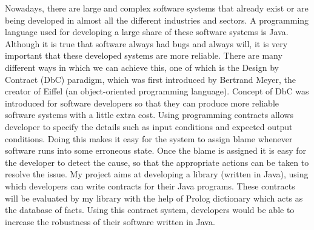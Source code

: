 Nowadays, there are large and complex software systems that already
exist or are being developed in almost all the different industries and
sectors. A programming language used for developing a large share
of these software systems is Java. Although it is true that software
always had bugs and always will, it is very important that these developed 
systems are more reliable. There are many different ways in
which we can achieve this, one of which is the Design by Contract
(DbC) paradigm, which was first introduced by Bertrand Meyer, the
creator of Eiffel (an object-oriented programming language).
Concept of DbC was introduced for software developers so that they
can produce more reliable software systems with a little extra cost.
Using programming contracts allows developer to specify the details
such as input conditions and expected output conditions. Doing this
makes it easy for the system to assign blame whenever software runs
into some erroneous state. Once the blame is assigned it is easy for
the developer to detect the cause, so that the appropriate actions can
be taken to resolve the issue. My project aims at developing a library (written in Java), using which 
developers can write contracts for their Java programs. These contracts will be evaluated
by my library with the help of Prolog dictionary which acts as the database of facts. Using this contract system, developers would be able to increase the robustness of their software written in Java.
